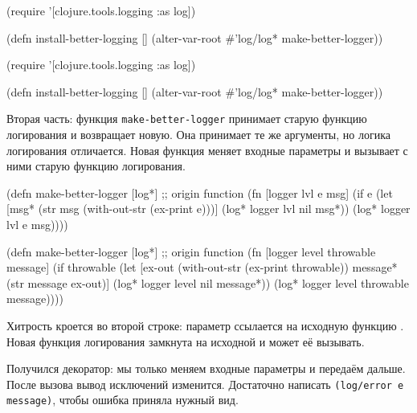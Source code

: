 \begin{clojure}
(require '[clojure.tools.logging :as log])

(defn install-better-logging []
  (alter-var-root
    #'log/log* make-better-logger))
\end{clojure}

\else

\begin{clojure}
(require '[clojure.tools.logging :as log])

(defn install-better-logging []
  (alter-var-root #'log/log* make-better-logger))
\end{clojure}

\fi

Вторая часть: функция \texttt{make-better-logger} принимает старую функцию
логирования и возвращает новую. Она принимает те же аргументы, но логика
логирования отличается. Новая функция меняет входные параметры и вызывает с ними
старую функцию логирования.

\ifnarrow

\begin{clojure/lines}
(defn make-better-logger
  [log*] ;; origin function
  (fn [logger lvl e msg]
    (if e
      (let [msg*
            (str msg \newline
                 (with-out-str
                   (ex-print e)))]
        (log* logger lvl nil msg*))
      (log* logger lvl e msg))))
\end{clojure/lines}

\else

\begin{clojure/lines}
(defn make-better-logger
  [log*] ;; origin function
  (fn [logger level throwable message]
    (if throwable
      (let [ex-out (with-out-str (ex-print throwable))
            message* (str message \newline ex-out)]
        (log* logger level nil message*))
      (log* logger level throwable message))))
\end{clojure/lines}

\fi

Хитрость кроется во второй строке: параметр  ссылается на исходную
функцию . Новая функция логирования замкнута на
исходной и может её вызывать.

Получился декоратор: мы только меняем входные параметры и передаём дальше. После
вызова  вывод исключений изменится. Достаточно
написать \texttt{(log/error e message)}, чтобы ошибка приняла нужный вид.

